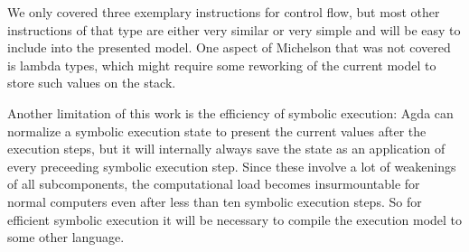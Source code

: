 We only covered three exemplary instructions for control flow,
but most other instructions of that type
are either very similar or very simple and will be easy to include into the presented model.
One aspect of Michelson that was not covered is lambda types,
which might require some reworking of the current model to store such values on the stack.

Another limitation of this work is the efficiency of symbolic execution:
Agda can normalize a symbolic execution state to present the current values after the execution 
steps, but it will internally always save the state as an application of every preceeding
symbolic execution step.
Since these involve a lot of weakenings of all subcomponents,
the computational load becomes insurmountable for normal computers even after
less than ten symbolic execution steps.
So for efficient symbolic execution it will be necessary to compile the execution model
to some other language.


